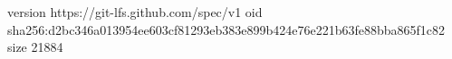 version https://git-lfs.github.com/spec/v1
oid sha256:d2bc346a013954ee603cf81293eb383e899b424e76e221b63fe88bba865f1c82
size 21884
